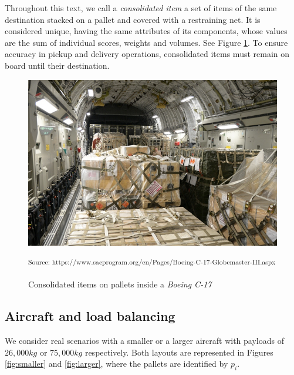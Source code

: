 \documentclass[preprint,authoryear]{elsarticle}
\begin{document}
Throughout this text, we call a {\it consolidated item} a set of items of the same destination stacked on a pallet and covered with a restraining net. It is considered unique, having the same attributes of its components, whose values are the sum of individual scores, weights and volumes. See Figure \ref{fig:larger2}. To ensure accuracy in pickup and delivery operations, consolidated items must remain on board until their destination.


\begin{figure}[H]
	\centering
	\includegraphics[scale=0.4]{Images/large.png}
	\caption{Consolidated items on pallets inside a {\it Boeing C-17}}
	\small\textsuperscript{Source: https://www.sacprogram.org/en/Pages/Boeing-C-17-Globemaster-III.aspx}
	\label{fig:larger2}
\end{figure}



\subsection{Aircraft and load balancing}


We consider real scenarios with a smaller or a larger aircraft with payloads of $26,000 kg$ or $75,000 kg$ respectively. Both layouts are represented in Figures \ref{fig:smaller} and \ref{fig:larger}, where the pallets are identified by $p_i$.
\end{document}
